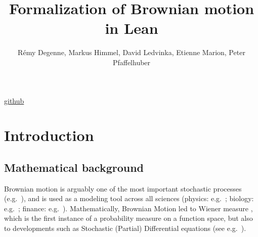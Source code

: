 \documentclass[lean]{AFM}
\title[Formalization of Brownian motion in Lean]{Formalization of Brownian motion in Lean}
\author[R. Degenne, M. Himmel, D. Ledvinka, E. Marion, P. Pfaffelhuber]{
  Rémy Degenne, Markus Himmel, David Ledvinka, Etienne Marion, Peter Pfaffelhuber}
\makeatletter
\newcommand\leanlink{\begingroup\catcode`\#=12\relax\@leanlink}
\newcommand\@leanlink[2]{\endgroup
\href{#1}
{\texttt{\detokenize{#2}}}}
\makeatother
\begin{document}
\href{https://github.com/RemyDegenne/brownian-motion}{github}




\section{Introduction}

\subsection{Mathematical background}
\sloppy Brownian motion is arguably one of the most important stochastic processes (e.g.\ \cite{karatzas1991brownian, morters2010brownian}), and is used as a modeling tool across all sciences (physics: e.g.\ \cite{einstein1906theorie, bian2016111}; biology: e.g.\ \cite{erban2014molecular}; finance: e.g.\ \cite{davis2006louis}). Mathematically, Brownian Motion led to Wiener measure \cite{wiener1923differential}, which is the first instance of a probability measure on a function space, but also to developments such as Stochastic (Partial) Differential equations (see e.g.\ \cite{hairer2009introduction}).
\end{document}
